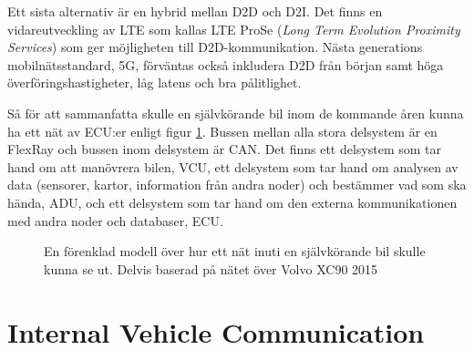 \documentclass[a4paper]{IEEEtran}
\begin{document}
Ett sista alternativ är en hybrid mellan D2D och D2I. Det finns en vidareutveckling av LTE som kallas LTE ProSe (\emph{Long Term Evolution Proximity Services}) som ger möjligheten till D2D-kommunikation. Nästa generations mobilnätsstandard, 5G, förväntas också inkludera D2D från början samt höga överföringshastigheter, låg latens och bra pålitlighet. \cite{5GPPP,LTED2D}

Så för att sammanfatta skulle en självkörande bil inom de kommande åren kunna ha ett nät av ECU:er enligt figur \ref{Img:CarScheme}.
Bussen mellan alla stora delsystem är en FlexRay och bussen inom delsystem är CAN. Det finns ett delsystem som tar hand om att manövrera bilen, VCU, ett delsystem som tar hand om analysen av data (sensorer, kartor, information från andra noder) och bestämmer vad som ska hända, ADU, och ett delsystem som tar hand om den externa kommunikationen med andra noder och databaser, ECU. 
\begin{figure}
	\begin{center}
	\end{center}
	\caption{En förenklad modell över hur ett nät inuti en självkörande bil skulle kunna se ut. Delvis baserad på nätet över Volvo XC90 2015 \cite{xc90Scheme}}
	\label{Img:CarScheme}
\end{figure}

\section{Internal Vehicle Communication}
\end{document}
